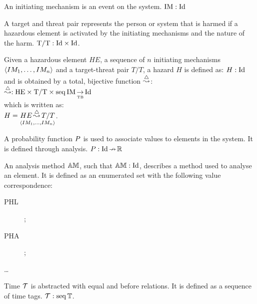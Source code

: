 \begin{definition}
An initiating mechanism is an event on the system.
%
$\hmdatatypeIM: \hmdatatypeId$
\end{definition}

\begin{definition}
A target and threat pair represents the person or system that is harmed if a hazardous element is activated by the initiating mechanisms and the nature of the harm. 
%
$\hmdatatypeTT: \hmcartesian{\hmdatatypeId}{\hmdatatypeId}$.
\end{definition}

\begin{definition}[Hazard]
Given a hazardous element $HE$, a sequence of $n$ initiating mechanisms $\hmseqenum{IM_1, \ldots, IM_n}$ and a target-threat pair $T/T$, a hazard $H$ is defined as: $H: \hmdatatypeId$ and is obtained by a total, bijective function $\hmhazardsymbol$: 
%
\\$\hmhazardsymbol: \hmtotalbijectivefunction{\hmcartesian{\hmcartesian{\hmdatatypeHE}{\hmdatatypeTT}}{\hmseq{\hmdatatypeIM}}}{\hmdatatypeId}$
%
\\which is written as:
%
\\$H = \hmhazard{HE}{\hmseqenum{IM_1, \ldots, IM_n}}{T/T}$.
\end{definition}

\begin{definition}
A probability function $\hmprobabilitysymbol$ is used to associate values to elements in the system.
%
It is defined through analysis. 
%
$\hmprobabilitysymbol: \hmpartialfunction{\hmdatatypeId}{\hmdatatypeR}$
\end{definition}

\begin{definition}
An analysis method $\hmdatatypeAM$, such that $\hmdatatypeAM: \hmdatatypeId$, describes a method used to analyse an element. 
%
It is defined as an enumerated set with the following value correspondence:
%
\begin{description}
  \item[PHL] \PHL;
  \item[PHA] \PHA;
  \item[\ldots] 
\end{description}
\end{definition}

\begin{definition}[Time]
Time $\hmdatatypetime$ is abstracted with equal and before relations. 
%
It is defined as a sequence of time tags.
%
$\hmdatatypetime: \hmseq{\hmdatatypetimetag}$.
\end{definition}

